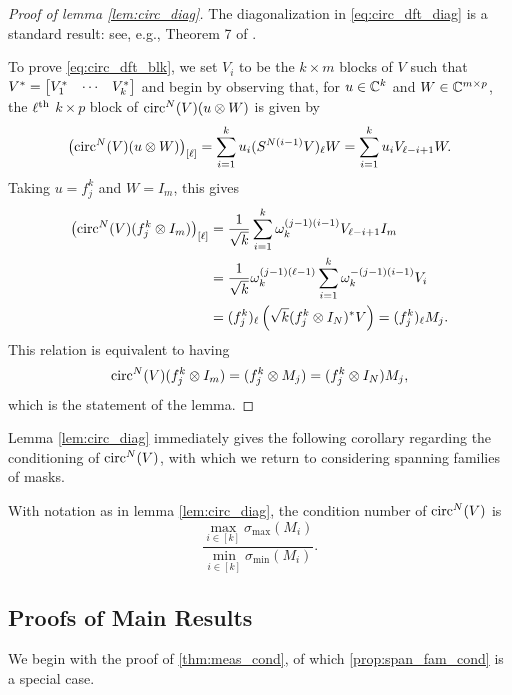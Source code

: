 \begin{proof}[Proof of lemma \ref{lem:circ_diag}]
  The diagonalization in \eqref{eq:circ_dft_diag} is a standard result: see, e.g., Theorem 7 of \cite{gray2006circulant}.

  To prove \eqref{eq:circ_dft_blk}, we set $V_i$ to be the $k \times m$ blocks of $V$ such that $V^* = \begin{bmatrix} V^*_{1} & \cdots & V^*_{k} \end{bmatrix}$ and begin by observing that, for $u \in \mathbb{C}^k$ and $W \in \mathbb{C}^{m \times p}$, the $\ell^{\text{th}}$ $k \times p$ block of $\operatorname{circ}^N(V)(u \otimes W)$ is given by \[\left(\operatorname{circ}^N(V)(u \otimes W)\right)_{[\ell]} = \sum_{i = 1}^k u_i (S^{N (i - 1)}V)_\ell W = \sum_{i = 1}^k u_i V_{\ell - i + 1} W.\]  Taking $u = f_j^k$ and $W = I_m$, this gives \begin{align*} \left(\operatorname{circ}^N(V)(f_j^k \otimes I_m)\right)_{[\ell]} &= \frac{1}{\sqrt{k}}\sum_{i = 1}^k \omega_k^{(j - 1) (i - 1)} V_{\ell - i + 1} I_m \\ &= \frac{1}{\sqrt{k}} \omega_k^{(j - 1) (\ell - 1)} \sum_{i = 1}^k \omega_k^{-(j - 1)(i - 1)} V_i \\ &= (f_j^k)_\ell \left(\sqrt{k} (f_j^k \otimes I_N)^* V \right) = (f_j^k)_\ell M_j. \end{align*}  This relation is equivalent to having \[\operatorname{circ}^N(V) (f_j^k \otimes I_m) = (f_j^k \otimes M_j) = (f_j^k \otimes I_N) M_j,\] which is the statement of the lemma.
\end{proof}

Lemma \ref{lem:circ_diag} immediately gives the following corollary regarding the conditioning of $\operatorname{circ}^N(V)$, with which we return to considering spanning families of masks.

\begin{corollary} \label{cor:circ_diag_condition}
  With notation as in lemma \ref{lem:circ_diag}, the condition number of $\operatorname{circ}^N(V)$ is \[\dfrac{\max\limits_{i \in [k]} \sigma_{\max} (M_i)}{\min\limits_{i \in [k]} \sigma_{\min} (M_i)}.\]
\end{corollary}

\subsection{Proofs of Main Results}
\label{sec:gam_fam}
We begin with the proof of \cref{thm:meas_cond}, of which \cref{prop:span_fam_cond} is a special case.

